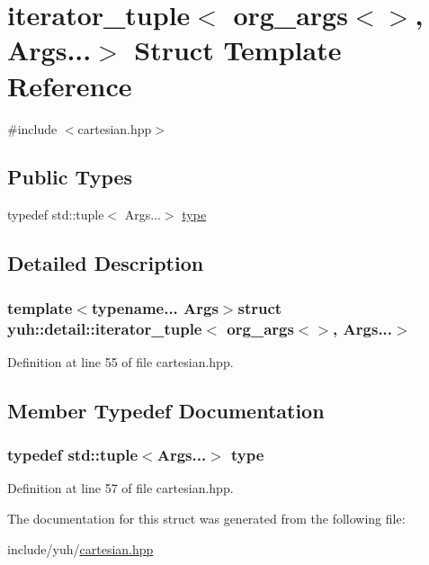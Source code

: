 \hypertarget{structyuh_1_1detail_1_1iterator__tuple_3_01org__args_3_4_00_01Args_8_8_8_4}{\section{iterator\-\_\-tuple$<$ org\-\_\-args$<$$>$, \-Args...$>$ \-Struct \-Template \-Reference}
\label{da/d79/structyuh_1_1detail_1_1iterator__tuple_3_01org__args_3_4_00_01Args_8_8_8_4}
}


{\ttfamily \#include $<$cartesian.\-hpp$>$}

\subsection*{\-Public \-Types}
\begin{DoxyCompactItemize}
\item 
typedef std\-::tuple$<$ \-Args...$>$ \hyperlink{structyuh_1_1detail_1_1iterator__tuple_3_01org__args_3_4_00_01Args_8_8_8_4_a0c208c6f55e889b43018b13a7aa6a8da}{type}
\end{DoxyCompactItemize}


\subsection{\-Detailed \-Description}
\subsubsection*{template$<$typename... \-Args$>$struct yuh\-::detail\-::iterator\-\_\-tuple$<$ org\-\_\-args$<$$>$, Args...$>$}



\-Definition at line 55 of file cartesian.\-hpp.



\subsection{\-Member \-Typedef \-Documentation}
\hypertarget{structyuh_1_1detail_1_1iterator__tuple_3_01org__args_3_4_00_01Args_8_8_8_4_a0c208c6f55e889b43018b13a7aa6a8da}{
\subsubsection[{type}]{\setlength{\rightskip}{0pt plus 5cm}typedef std\-::tuple$<$\-Args...$>$ {\bf type}}}\label{da/d79/structyuh_1_1detail_1_1iterator__tuple_3_01org__args_3_4_00_01Args_8_8_8_4_a0c208c6f55e889b43018b13a7aa6a8da}


\-Definition at line 57 of file cartesian.\-hpp.



\-The documentation for this struct was generated from the following file\-:\begin{DoxyCompactItemize}
\item 
include/yuh/\hyperlink{cartesian_8hpp}{cartesian.\-hpp}\end{DoxyCompactItemize}
